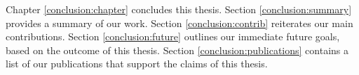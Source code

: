 Chapter \ref{conclusion:chapter} concludes this thesis. Section
\ref{conclusion:summary} provides a summary of our work. Section
\ref{conclusion:contrib} reiterates our main contributions. Section
\ref{conclusion:future} outlines our immediate future goals, based on the
outcome of this thesis. Section \ref{conclusion:publications} contains a list of
our publications that support the claims of this thesis.

